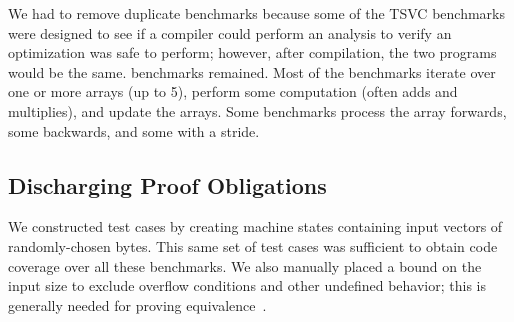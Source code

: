 We had to remove duplicate benchmarks because some of the TSVC
benchmarks were designed to see if a compiler could perform an
analysis to verify an optimization was safe to perform; however,
after compilation, the two programs would be the same. \totalbench{} benchmarks
remained. Most of the benchmarks iterate over one or more arrays (up
to 5), perform some computation (often adds and multiplies), and
update the arrays. Some benchmarks process the array forwards, some
backwards, and some with a stride.

\subsection{Discharging Proof Obligations}

We constructed test cases by creating machine states containing input
vectors of randomly-chosen bytes. This same set of test cases was
sufficient to obtain code coverage over all these benchmarks. We
also manually placed a bound on the input size to exclude overflow
conditions and other undefined behavior; this is generally needed for
proving equivalence~\cite{Dahiya17HVC}.












